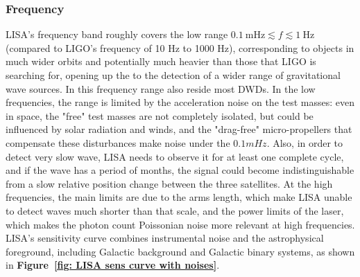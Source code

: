 \subsubsection{Frequency}
LISA's frequency band roughly covers the low range $0.1~\mathrm{mHz} \lesssim f \lesssim 1~\mathrm{Hz}$ (compared to LIGO's frequency of 10 Hz to 1000 Hz), corresponding to objects in much wider orbits and potentially much heavier than those that LIGO is searching for, opening up the to the detection of a wider range of gravitational wave sources. 
In this frequency range also reside most DWDs.  
In the low frequencies, the range is limited by the acceleration noise on the test masses: even in space, the "free" test masses are not completely isolated, but could be influenced by solar radiation and winds, and the "drag-free" micro-propellers that compensate these disturbances make noise under the $0.1mHz$. 
Also, in order to detect very slow wave, LISA needs to observe it for at least one complete cycle, and if the wave has a period of months, the signal could become indistinguishable from a slow relative position change between the three satellites.
At the high frequencies, the main limits are due to the arms length, which make LISA unable to detect waves much shorter than that scale, and the power limits of the laser, which makes the photon count Poissonian noise more relevant at high frequencies.  
LISA’s sensitivity curve combines instrumental noise and the astrophysical foreground, including Galactic background and Galactic binary systems, as shown in \textbf{Figure~\ref{fig: LISA sens curve with noises}}. 
